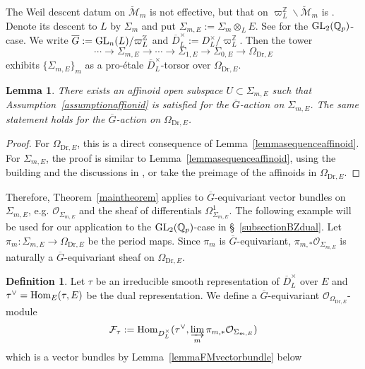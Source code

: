 \documentclass[a4paper,10pt]{amsart}
\theoremstyle{remark}
\theoremstyle{definition}
\newtheorem{definition}[theorem]{Definition}
\theoremstyle{plain}
\newtheorem{lemma}[theorem]{Lemma}
\numberwithin{equation}{section}
\newcommand{\bbQ}{{\mathbb Q}}
\newcommand{\bbZ}{{\mathbb Z}}
\newcommand{\calF}{{\mathcal F}}
\newcommand{\calM}{{\mathcal M}}
\newcommand{\calO}{{\mathcal O}}
\newcommand{\ovD}{{\overline D}}
\newcommand{\ovG}{{\overline G}}
\newcommand{\GL}{{\rm GL}}
\newcommand{\Hom}{{\rm Hom}}
\begin{document}
The Weil descent datum on $\breve{\calM}_m$ is not effective, but that on $\varpi_L^{\mathbb Z}\backslash\breve{\calM}_m$ is \cite[Thm.~3.49]{rapoportZink1996}. Denote its descent to $L$ by $\Sigma_m$ and put $\Sigma_{m,E}:=\Sigma_m\otimes_{L}E$. See \cite[\S1.1 and \S3.1]{dospinescuLeBras2017revetements} for the $\GL_2(\bbQ_p)$-case. We write $\ovG:=\GL_n(L)/\varpi_L^{\bbZ}$ and $ \ovD_L^{\times}:=D_L^{\times}/\varpi_L^{\bbZ}$. Then the tower
\begin{equation}\label{equationDrinfeldtowerrational}
	\cdots\to\Sigma_{m,E}\rightarrow \cdots \rightarrow \Sigma_{1,E}\rightarrow \Sigma_{0,E}\rightarrow \Omega_{\mathrm{Dr},E}
\end{equation}
exhibits $ \{\Sigma_{m,E}\}_{m}$ as a pro-\'etale $\ovD_L^{\times}$-torsor over $\Omega_{\mathrm{Dr},E}$.
\begin{lemma}
	There exists an affinoid open subspace $U\subset \Sigma_{m,E}$ such that Assumption~\ref{assumptionaffionid} is satisfied for the $\ovG$-action on $\Sigma_{m,E}$. The same statement holds for the $\ovG$-action on $\Omega_{\mathrm{Dr},E}$.
\end{lemma}
\begin{proof}
	For $\Omega_{\mathrm{Dr},E}$, this is a direct consequence of Lemma~\ref{lemmasequenceaffinoid}. For $\Sigma_{m,E}$, the proof is similar to Lemma~\ref{lemmasequenceaffinoid}, using the building and the discussions in \cite[\S~3.71]{rapoportZink1996}, or take the preimage of the affinoids in $\Omega_{\mathrm{Dr},E}$. 
\end{proof}
Therefore, Theorem~\ref{maintheorem} applies to $\ovG$-equivariant vector bundles on $\Sigma_{m,E}$, e.g. $\calO_{\Sigma_{m,E}}$ and the sheaf of differentials $\Omega_{\Sigma_{m,E}}^1$. The following example will be used for our application to the $\GL_2(\bbQ_p)$-case in \S~\ref{subsectionBZdual}. Let $\pi_m:\Sigma_{m,E}\rightarrow \Omega_{\mathrm{Dr},E}$ be the period maps. Since $\pi_m$ is $\ovG$-equivariant, $\pi_{m,*}\calO_{\Sigma_{m,E}}$ is naturally a $\ovG$-equivariant sheaf on $\Omega_{\mathrm{Dr},E}$.
\begin{definition}\label{definitionFM}
	Let $\tau$ be an irreducible smooth representation of $\ovD_L^{\times}$ over $E$ and $\tau^{\vee}=\Hom_E(\tau,E)$ be the dual representation. We define a $\ovG$-equivariant $\calO_{\Omega_{\mathrm{Dr},E}}$-module 
	\[\calF_{\tau}:=\Hom_{D_L^{\times}}(\tau^{\vee},\varinjlim_m\pi_{m,*}\calO_{\Sigma_{m,E}})\]
	which is a vector bundles by Lemma~\ref{lemmaFMvectorbundle} below
\end{definition}
\end{document}
